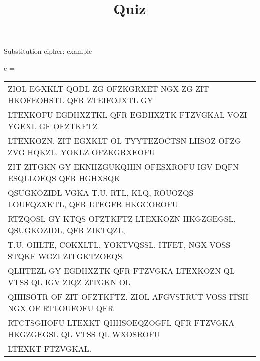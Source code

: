 \documentclass[aspectratio=169, lualatex, handout, 10pt,dvipsnames,svgnames]{beamer} %
\def\envert#1{\textcolor{vert}{#1}}
\begin{document}
\begin{frame}{Substitution cipher: example}
  \envert{
    \scriptsize{c =
      \begin{tabular}[t]{l}
        ZIOL EGXKLT QODL ZG OFZKGRXET NGX ZG ZIT HKOFEOHSTL QFR ZTEIFOJXTL GY \\
        LTEXKOFU EGDHXZTKL QFR EGDHXZTK FTZVGKAL VOZI YGEXL GF OFZTKFTZ \\
        LTEXKOZN. ZIT EGXKLT OL TYYTEZOCTSN LHSOZ OFZG ZVG HQKZL. YOKLZ OFZKGRXEOFU \\
        ZIT ZITGKN GY EKNHZGUKQHIN OFESXROFU IGV DQFN ESQLLOEQS QFR HGHXSQK \\
        QSUGKOZIDL VGKA T.U. RTL, KLQ, ROUOZQS LOUFQZXKTL, QFR LTEGFR HKGCOROFU\\
        RTZQOSL GY KTQS OFZTKFTZ LTEXKOZN HKGZGEGSL, QSUGKOZIDL, QFR ZIKTQZL,\\
        T.U. OHLTE, COKXLTL, YOKTVQSSL. ITFET, NGX VOSS STQKF WGZI ZITGKTZOEQS\\
        QLHTEZL GY EGDHXZTK QFR FTZVGKA LTEXKOZN QL VTSS QL IGV ZIQZ ZITGKN OL\\
        QHHSOTR OF ZIT OFZTKFTZ. ZIOL AFGVSTRUT VOSS ITSH NGX OF RTLOUFOFU QFR\\
       RTCTSGHOFU LTEXKT QHHSOEQZOGFL QFR FTZVGKA HKGZGEGSL QL VTSS QL WXOSROFU\\
       LTEXKT FTZVGKAL.
      \end{tabular}
    }}
\end{frame}

\title{Quiz}
\author{}
\date{}
\begin{frame}{}
\titlepage  
\end{frame}
\end{document}

